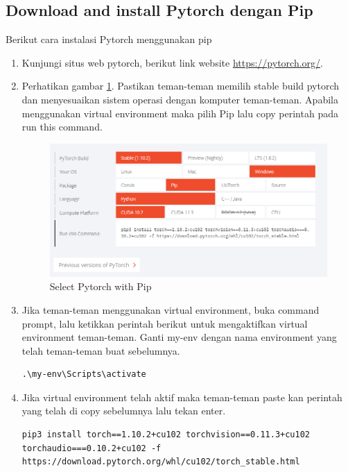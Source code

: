 \subsection{Download and install Pytorch dengan Pip}
Berikut cara instalasi Pytorch menggunakan pip
\begin{enumerate}
\item Kunjungi situs web pytorch, berikut link website \url{https://pytorch.org/}.

\item Perhatikan gambar \ref{pytorch2}. Pastikan teman-teman memilih stable build pytorch dan menyesuaikan sistem operasi dengan komputer teman-teman. Apabila menggunakan virtual environment maka pilih Pip lalu copy perintah pada run this command.
\begin{figure}[H]
\centering
\includegraphics[scale=.45]{figures/pytorch2}
\caption{Select Pytorch with Pip}
\label{pytorch2}
\end{figure}

\item Jika teman-teman menggunakan virtual environment, buka command prompt, lalu ketikkan perintah berikut untuk mengaktifkan virtual environment teman-teman. Ganti my-env dengan nama environment yang telah teman-teman buat sebelumnya.
\begin{verbatim}
.\my-env\Scripts\activate
\end{verbatim}

\item Jika virtual environment telah aktif maka teman-teman paste kan perintah yang telah di copy sebelumnya lalu tekan enter.
\begin{lstlisting}
pip3 install torch==1.10.2+cu102 torchvision==0.11.3+cu102 torchaudio===0.10.2+cu102 -f https://download.pytorch.org/whl/cu102/torch_stable.html
\end{lstlisting}


\end{enumerate}
